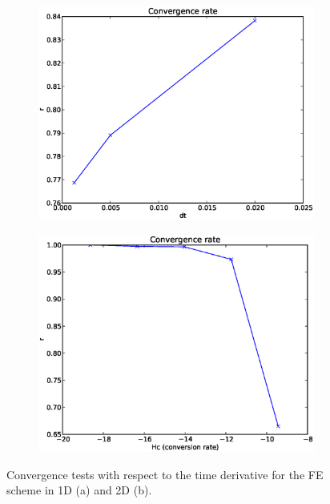\begin{figure}[h]
\centering
 \begin{subfigure}{0.49\textwidth}
  \includegraphics[width=\textwidth]{../results/experiment_18042014_1014_convergencetest_FE1D/results/ConvergenceTest.eps}
  \caption{}
 \end{subfigure}
 \begin{subfigure}{0.49\textwidth}
  \includegraphics[width=\textwidth]{../results/experiment_29112013_1709/results/ConvergenceTest.eps}
  \caption{}
 \end{subfigure}
 \caption[Convergence tests in time FE scheme]{Convergence tests with respect to the time derivative for the FE scheme in 1D (a) and 2D (b). }
 \label{analysis:convergence_tests:FE}
\end{figure}

